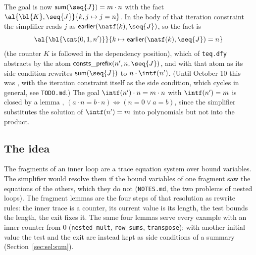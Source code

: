 The goal is now $\mathsf{sum}(\seq{J}) = m \cdot n$ with the fact
$\al{\bl{K}, \seq{J}}{k, j \mapsto j = n}$. In the body of that iteration constraint the simplifier
reads $j$ as $\mathsf{earlier}(\natf(k), \seq{J})$, so the fact is
\[ \al{\bl{\cnt(0, 1, n')}}{k \mapsto \mathsf{earlier}(\natf(k), \seq{J}) = n} \]
(the counter $K$ is followed in the dependency position), which  of \texttt{teq.dfy} abstracts
by the atom $\mathsf{consts\_prefix}(n', n, \seq{J})$, and  with that atom as
its side condition rewrites $\mathsf{sum}(\seq{J})$ to $n \cdot \intf(n')$. (Until October 10 this
was , with the iteration constraint itself as the side condition, which cycles
in general, see \texttt{TODO.md}.) The goal $\intf(n') \cdot n = m \cdot n$ with $\intf(n') = m$ is
closed by a lemma , $(a \cdot n = b \cdot n) \Leftrightarrow (n = 0 \vee a = b)$,
since the simplifier substitutes the solution of $\intf(n') = m$ into polynomials but not into the
product.

\subsection{The idea}
The fragments of an inner loop are a trace equation system over bound variables. The simplifier would
resolve them if the bound variables of one fragment saw the equations of the others, which they do not
(\texttt{NOTES.md}, the two problems of nested loops). The fragment lemmas are the four steps of that
resolution as rewrite rules: the inner trace is a counter, its current value is its length, the test
bounds the length, the exit fixes it. The same four lemmas serve every example with an inner counter
from $0$ (\texttt{nested\_mult}, \texttt{row\_sums}, \texttt{transpose}); with another initial value
the test and the exit are instead kept as side conditions of a summary (Section~\ref{sec:sel:sum}).
